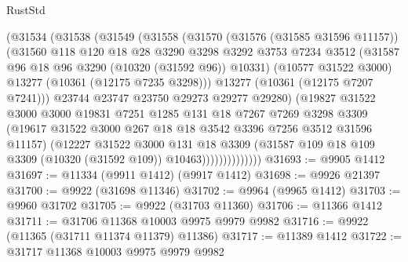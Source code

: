 \begin{lexlean}{RustStd}
\begin{coremodule}
                    (@31534
                      (@31538
                        (@31549
                          (@31558
                            (@31570
                              (@31576 (@31585 @31596 @11157))
                              (@31560
                                @118
                                @120
                                @18
                                @28
                                @3290
                                @3298
                                @3292
                                @3753
                                @7234
                                @3512
                                (@31587 @96 @18 @96 @3290 (@10320 (@31592 @96)) @10331)
                                (@10577 @31522 @3000)
                                @13277
                                (@10361 (@12175 @7235 @3298)))
                              @13277
                              (@10361 (@12175 @7207 @7241)))
                            @23744
                            @23747
                            @23750
                            @29273
                            @29277
                            @29280)
                          (@19827
                            @31522
                            @3000
                            @3000
                            @19831
                            @7251
                            @1285
                            @131
                            @18
                            @7267
                            @7269
                            @3298
                            @3309
                            (@19617 @31522 @3000 @267 @18 @18 @3542 @3396 @7256 @3512 @31596 @11157)
                            (@12227
                              @31522
                              @3000
                              @131
                              @18
                              @3309
                              (@31587
                                @109
                                @18
                                @109
                                @3309
                                (@10320 (@31592 @109))
                                @10463))))))))))))))
@31693 := @9905 @1412
@31697 := @11334 (@9911 @1412) (@9917 @1412)
@31698 := @9926 @21397
@31700 := @9922 (@31698 @11346)
@31702 := @9964 (@9965 @1412)
@31703 := @9960 @31702
@31705 := @9922 (@31703 @11360)
@31706 := @11366 @1412
@31711 := @31706 @11368 @10003 @9975 @9979 @9982
@31716 := @9922 (@11365 (@31711 @11374 @11379) @11386)
@31717 := @11389 @1412
@31722 := @31717 @11368 @10003 @9975 @9979 @9982

\end{coremodule}
\end{lexlean}
